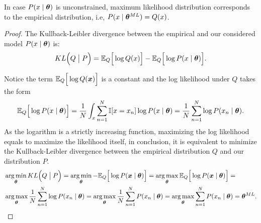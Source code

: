 \begin{proposition}
 In case \(P(x \mid \bm{\theta})\) is unconstrained, maximum likelihood distribution corresponds to the empirical distribution, i.e, \(P(x \mid \bm{\theta}^{ML}) = Q(x)\).
\end{proposition}
\begin{proof}
The Kullback-Leibler divergence between the empirical and our considered model \(P(x \mid \bm{\theta})\) is:
\[
  KL\Big(Q \bigm| P\Big) = \mathbb{E}_{Q}\Big[\log Q(x)\Big] - \mathbb{E}_{Q}\Big[\log P(x \mid \bm{\theta})\Big].
\]

Notice the term \(\mathbb{E}_{Q}\Big[\log Q(\bm{x})\Big]\) is a constant and the log likelihood under \(Q\) takes the form
\[
   \mathbb{E}_{Q}\Big[\log P(x \mid \bm{\theta})\Big] = \frac{1}{N}\int_{x}\sum_{n=1}^{N}\mathbb{I}[x = x_{n}]\log{P(x \mid \bm{\theta})} = \frac{1}{N}\sum_{n = 1}^N \log{P(x_n \mid \bm{\theta})}.
 \]
 As the logarithm is
 a strictly increasing function, maximizing the log likelihood equals to
 maximize the likelihood itself, in conclusion, it is equivalent to
 minimize the Kullback-Leibler divergence between the empirical distribution \( Q \)  and our distribution \( P \).
 \[
   \begin{aligned}
     &\operatorname*{arg\,min}_{\bm{\theta}} KL\Big(Q \bigm| P\Big) = \operatorname*{arg\,min}_{\bm{\theta}} - \mathbb{E}_{Q}\Big[\log P(\bm{x} \mid \bm{\theta})\Big] =  \operatorname*{arg\,max}_{\bm{\theta}} \mathbb{E}_{Q}\Big[\log P(\bm{x} \mid \bm{\theta})\Big] =\\
     &\operatorname*{arg\,max}_{\bm{\theta}} \frac{1}{N}\sum_{n=1}^{N}\log{P(x_{n} \mid \bm{\theta})} =  \operatorname*{arg\,max}_{\bm{\theta}} \frac{1}{N}\sum_{n=1}^{N}P(x_{n} \mid \bm{\theta}) = \operatorname*{arg\,max}_{\bm{\theta}} \sum_{n=1}^{N}P(x_{n}\mid \bm{\theta})= \bm{\theta}^{ML}.
   \end{aligned}
 \]

\end{proof}
